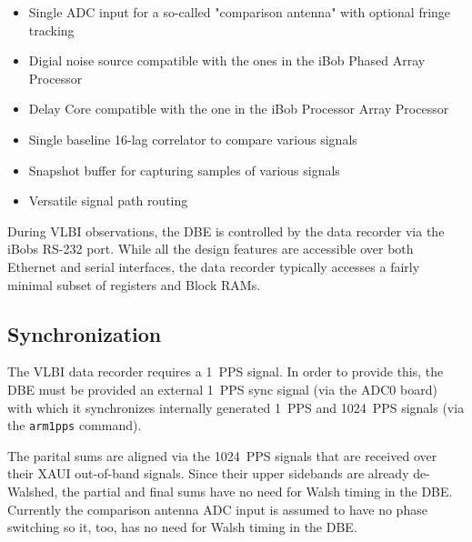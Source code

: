 \documentclass[12pt]{article}
\begin{document}
\begin{itemize}
\item Single ADC input for a so-called "comparison antenna" with optional
fringe tracking
\item Digial noise source compatible with the ones in the iBob Phased Array
Processor
\item Delay Core compatible with the one in the iBob Processor Array Processor
\item Single baseline 16-lag correlator to compare various signals
\item Snapshot buffer for capturing samples of various signals
\item Versatile signal path routing
\end{itemize}

During VLBI observations, the DBE is controlled by the data recorder via the
iBobs RS-232 port.  While all the design features are accessible over both
Ethernet and serial interfaces, the data recorder typically accesses a fairly
minimal subset of registers and Block RAMs.

  \subsection{Synchronization}

The VLBI data recorder requires a 1~PPS signal.  In order to provide this, the
DBE must be provided an external 1~PPS sync signal (via the ADC0 board) with
which it synchronizes internally generated 1~PPS and 1024~PPS signals (via the
\verb|arm1pps| command).

The parital sums are aligned via the 1024~PPS signals that are received over
their XAUI out-of-band signals.  Since their upper sidebands are already
de-Walshed, the partial and final sums have no need for Walsh timing in the
DBE.  Currently the comparison antenna ADC input is assumed to have no phase
switching so it, too, has no need for Walsh timing in the DBE.
\end{document}
